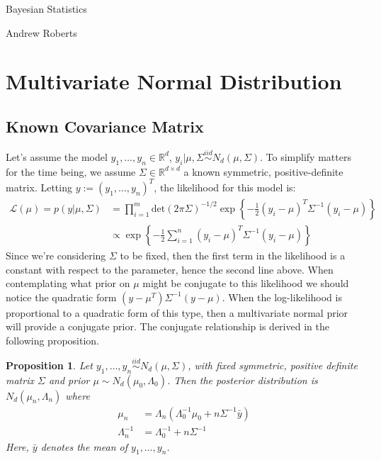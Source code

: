 \documentclass[12pt]{article}
\newcommand{\R}{\mathcal{R}}
\def\R{\mathbb{R}}
\newtheorem{prop}{Proposition}
\begin{document}
\begin{center}
\Large
Bayesian Statistics
\end{center}

\begin{flushright}
Andrew Roberts
\end{flushright} 

\section{Multivariate Normal Distribution}
\subsection{Known Covariance Matrix} \label{mvn_mean}
Let's assume the model $y_1, \dots, y_n \in \R^d$, $y_i|\mu, \Sigma \overset{iid}{\sim} N_d(\mu, \Sigma)$. To simplify matters for the time being, we assume 
$\Sigma \in \R^{d \times d}$ a known symmetric, positive-definite matrix. Letting $y := (y_1, \dots, y_n)^T$, the likelihood for this model is: 
\begin{align*}
\mathcal{L}(\mu) = p(y|\mu, \Sigma) &= \prod_{i = 1}^{m} \text{det}(2\pi \Sigma)^{-1/2} \exp\left\{-\frac{1}{2}(y_i - \mu)^T \Sigma^{-1}(y_i - \mu)\right\} \\
			  			       &\propto \exp\left\{-\frac{1}{2} \sum_{i = 1}^{n} (y_i - \mu)^T \Sigma^{-1}(y_i - \mu)\right\}
\end{align*}
Since we're considering $\Sigma$ to be fixed, then the first term in the likelihood is a constant with respect to the parameter, hence the second line above. 
When contemplating what prior on $\mu$ might be conjugate to this likelihood we should notice the quadratic form $(y - \mu^T)\Sigma^{-1}(y - \mu)$. When the 
log-likelihood is proportional to a quadratic form of this type, then a multivariate normal prior will provide a conjugate prior. The conjugate relationship 
is derived in the following proposition. 
\begin{prop} \label{normal_mean_known_variance}
Let $y_1, \dots, y_n \overset{iid}{\sim} N_d(\mu, \Sigma)$, with fixed symmetric, positive definite matrix $\Sigma$ and prior $\mu \sim N_d(\mu_0, \Lambda_0)$.
Then the posterior distribution is $N_d(\mu_n, \Lambda_n)$
where 
\begin{align*}
\mu_n &= \Lambda_n (\Lambda_0^{-1} \mu_0 + n \Sigma^{-1} \bar{y}) \\
\Lambda_n^{-1} &= \Lambda_0^{-1} + n \Sigma^{-1}
\end{align*}
Here, $\bar{y}$ denotes the mean of $y_1, \dots, y_n$. 
\end{prop}
\end{document}
